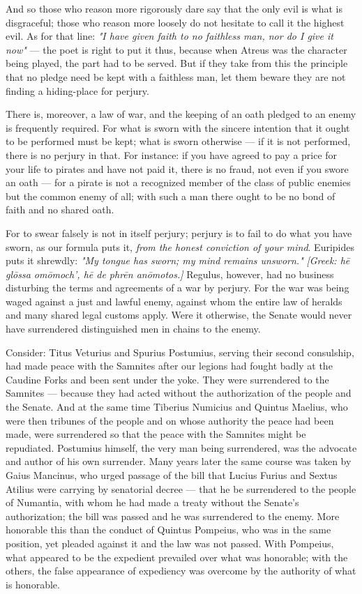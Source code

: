  And so those who reason more rigorously dare say that the only evil is what is disgraceful; those who reason more loosely do not hesitate to call it the highest evil. As for that line: \textit{"I have given faith to no faithless man, nor do I give it now"} — the poet is right to put it thus, because when Atreus was the character being played, the part had to be served. But if they take from this the principle that no pledge need be kept with a faithless man, let them beware they are not finding a hiding-place for perjury.

 There is, moreover, a law of war, and the keeping of an oath pledged to an enemy is frequently required. For what is sworn with the sincere intention that it ought to be performed must be kept; what is sworn otherwise — if it is not performed, there is no perjury in that. For instance: if you have agreed to pay a price for your life to pirates and have not paid it, there is no fraud, not even if you swore an oath — for a pirate is not a recognized member of the class of public enemies but the common enemy of all; with such a man there ought to be no bond of faith and no shared oath.

 For to swear falsely is not in itself perjury; perjury is to fail to do what you have sworn, as our formula puts it, \textit{from the honest conviction of your mind}. Euripides puts it shrewdly: \textit{"My tongue has sworn; my mind remains unsworn."} \textit{[Greek: hē glōssa omōmoch', hē de phrēn anōmotos.]} Regulus, however, had no business disturbing the terms and agreements of a war by perjury. For the war was being waged against a just and lawful enemy, against whom the entire law of heralds and many shared legal customs apply. Were it otherwise, the Senate would never have surrendered distinguished men in chains to the enemy.

 Consider: Titus Veturius and Spurius Postumius, serving their second consulship, had made peace with the Samnites after our legions had fought badly at the Caudine Forks and been sent under the yoke. They were surrendered to the Samnites — because they had acted without the authorization of the people and the Senate. And at the same time Tiberius Numicius and Quintus Maelius, who were then tribunes of the people and on whose authority the peace had been made, were surrendered so that the peace with the Samnites might be repudiated. Postumius himself, the very man being surrendered, was the advocate and author of his own surrender. Many years later the same course was taken by Gaius Mancinus, who urged passage of the bill that Lucius Furius and Sextus Atilius were carrying by senatorial decree — that he be surrendered to the people of Numantia, with whom he had made a treaty without the Senate's authorization; the bill was passed and he was surrendered to the enemy. More honorable this than the conduct of Quintus Pompeius, who was in the same position, yet pleaded against it and the law was not passed. With Pompeius, what appeared to be the expedient prevailed over what was honorable; with the others, the false appearance of expediency was overcome by the authority of what is honorable.

